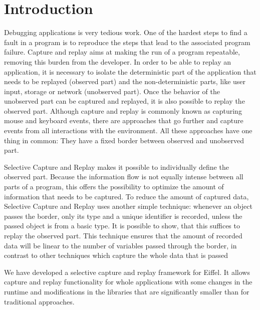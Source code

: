 \chapter{Introduction}
Debugging applications is very tedious work. One of the hardest steps to find a fault in a program is to reproduce the steps that lead to the associated program failure. Capture and replay aims at making the run of a program repeatable, removing this burden from the developer. In order to be able to replay an application, it is necessary to isolate the deterministic part of the application that needs to be replayed (observed part) and the non-deterministic parts, like user input, storage or network (unobserved part). Once the behavior of the unobserved part can be captured and replayed, it is also possible to replay the observed part. Although capture and replay is commonly known as capturing mouse and keyboard events, there are approaches that go further and capture events from all interactions with the environment. All these approaches have one thing in common: They have a fixed border between observed and unobserved part.

Selective Capture and Replay \cite{orso05may} makes it possible to individually define the observed part. Because the information flow is not equally intense between all parts of a program, this offers the possibility to optimize the amount of information that needs to be captured. To reduce the amount of captured data, Selective Capture and Replay uses another simple technique: whenever an object passes the border, only its type and a unique identifier is recorded, unless the passed object is from a basic type. It is possible to show, that this suffices to replay the observed part. This technique ensures that the amount of recorded data will be linear to the number of variables passed through the border, in contrast to other techniques which capture the whole data that is passed

We have developed a selective capture and replay framework for Eiffel. It allows capture and replay functionality for whole applications with some changes in the runtime and modifications in the libraries that are significantly smaller than for traditional approaches.

